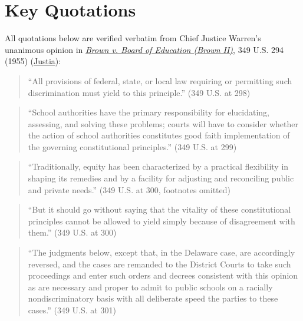 \documentclass[12pt]{article}
\begin{document}
\section{Key Quotations}

All quotations below are verified verbatim from Chief Justice Warren's unanimous opinion in \href{https://www.courtlistener.com/opinion/105312/brown-v-board-of-education/}{\textit{Brown v. Board of Education (Brown II)}}, 349 U.S. 294 (1955) (\href{https://supreme.justia.com/cases/federal/us/349/294/}{Justia}):

\begin{quote}
``All provisions of federal, state, or local law requiring or permitting such discrimination must yield to this principle.'' \hfill (349 U.S. at 298)
\end{quote}

\begin{quote}
``School authorities have the primary responsibility for elucidating, assessing, and solving these problems; courts will have to consider whether the action of school authorities constitutes good faith implementation of the governing constitutional principles.'' \hfill (349 U.S. at 299)
\end{quote}

\begin{quote}
``Traditionally, equity has been characterized by a practical flexibility in shaping its remedies and by a facility for adjusting and reconciling public and private needs.'' \hfill (349 U.S. at 300, footnotes omitted)
\end{quote}

\begin{quote}
``But it should go without saying that the vitality of these constitutional principles cannot be allowed to yield simply because of disagreement with them.'' \hfill (349 U.S. at 300)
\end{quote}

\begin{quote}
``The judgments below, except that, in the Delaware case, are accordingly reversed, and the cases are remanded to the District Courts to take such proceedings and enter such orders and decrees consistent with this opinion as are necessary and proper to admit to public schools on a racially nondiscriminatory basis with all deliberate speed the parties to these cases.'' \hfill (349 U.S. at 301)
\end{quote}
\end{document}
